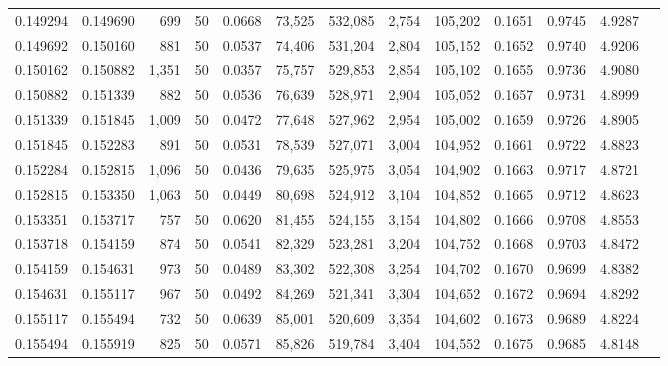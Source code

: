 \begin{tabular}{rrrrrrrrrrrrr}
0.149294 & 0.149690 &   699 &  50 &                                     0.0668 &  73,525 & 532,085 &   2,754 & 105,202 & 0.1651 & 0.9745 & 4.9287 \\
0.149692 & 0.150160 &   881 &  50 &                                     0.0537 &  74,406 & 531,204 &   2,804 & 105,152 & 0.1652 & 0.9740 & 4.9206 \\
0.150162 & 0.150882 & 1,351 &  50 &                                     0.0357 &  75,757 & 529,853 &   2,854 & 105,102 & 0.1655 & 0.9736 & 4.9080 \\
0.150882 & 0.151339 &   882 &  50 &                                     0.0536 &  76,639 & 528,971 &   2,904 & 105,052 & 0.1657 & 0.9731 & 4.8999 \\
0.151339 & 0.151845 & 1,009 &  50 &                                     0.0472 &  77,648 & 527,962 &   2,954 & 105,002 & 0.1659 & 0.9726 & 4.8905 \\
0.151845 & 0.152283 &   891 &  50 &                                     0.0531 &  78,539 & 527,071 &   3,004 & 104,952 & 0.1661 & 0.9722 & 4.8823 \\
0.152284 & 0.152815 & 1,096 &  50 &                                     0.0436 &  79,635 & 525,975 &   3,054 & 104,902 & 0.1663 & 0.9717 & 4.8721 \\
0.152815 & 0.153350 & 1,063 &  50 &                                     0.0449 &  80,698 & 524,912 &   3,104 & 104,852 & 0.1665 & 0.9712 & 4.8623 \\
0.153351 & 0.153717 &   757 &  50 &                                     0.0620 &  81,455 & 524,155 &   3,154 & 104,802 & 0.1666 & 0.9708 & 4.8553 \\
0.153718 & 0.154159 &   874 &  50 &                                     0.0541 &  82,329 & 523,281 &   3,204 & 104,752 & 0.1668 & 0.9703 & 4.8472 \\
0.154159 & 0.154631 &   973 &  50 &                                     0.0489 &  83,302 & 522,308 &   3,254 & 104,702 & 0.1670 & 0.9699 & 4.8382 \\
0.154631 & 0.155117 &   967 &  50 &                                     0.0492 &  84,269 & 521,341 &   3,304 & 104,652 & 0.1672 & 0.9694 & 4.8292 \\
0.155117 & 0.155494 &   732 &  50 &                                     0.0639 &  85,001 & 520,609 &   3,354 & 104,602 & 0.1673 & 0.9689 & 4.8224 \\
0.155494 & 0.155919 &   825 &  50 &                                     0.0571 &  85,826 & 519,784 &   3,404 & 104,552 & 0.1675 & 0.9685 & 4.8148 \\

\end{tabular}
